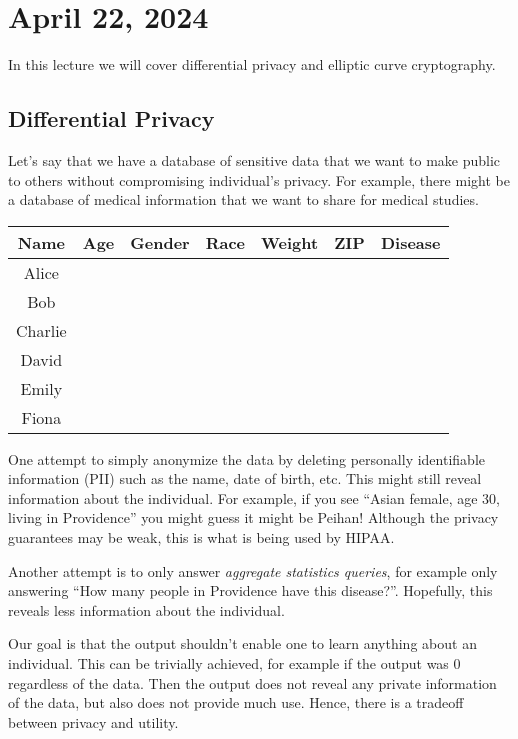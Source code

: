 \section{April 22, 2024}
\label{20240422}

In this lecture we will cover differential privacy and elliptic curve cryptography.

\subsection{Differential Privacy}

Let's say that we have a database of sensitive data that we want to make public to others without compromising individual's privacy. For example, there might be a database of medical information that we want to share for medical studies.

\begin{center}
    \begin{tabular}{|c|c|c|c|c|c|c|}
        \hline
        Name & Age & Gender & Race & Weight & ZIP & Disease\\ \hline
        Alice & & & & & &\\ \hline
        Bob & & & & & &\\ \hline
        Charlie & & & & & &\\ \hline
        David & & & & & &\\ \hline
        Emily & & & & & &\\ \hline
        Fiona & & & & & &\\ \hline
    \end{tabular}
\end{center}

One attempt to simply anonymize the data by deleting personally identifiable information (PII) such as the name, date of birth, etc. This might still reveal information about the individual. For example, if you see ``Asian female, age 30, living in Providence'' you might guess it might be Peihan! Although the privacy guarantees may be weak, this is what is being used by HIPAA.

Another attempt is to only answer \textit{aggregate statistics queries}, for example only answering ``How many people in Providence have this disease?''. Hopefully, this reveals less information about the individual.

Our goal is that the output shouldn't enable one to learn anything about an individual. This can be trivially achieved, for example if the output was 0 regardless of the data. Then the output does not reveal any private information of the data, but also does not provide much use. Hence, there is a tradeoff between privacy and utility.

